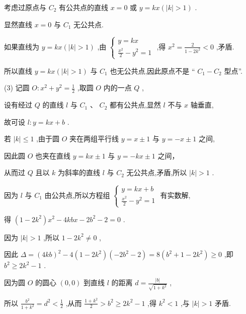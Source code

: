 \documentclass[10pt]{article}
\begin{document}
考虑过原点与 \({C}_{2}\) 有公共点的直线 \(x = 0\) 或 \(y = {kx}\left( {\left| k\right|  > 1}\right)\) .

显然直线 \(x = 0\) 与 \({C}_{1}\) 无公共点.

如果直线为 \(y = {kx}\left( {\left| k\right|  > 1}\right)\) ,由 \(\left\{  \begin{array}{l} y = {kx} \\  \frac{{x}^{2}}{2} - {y}^{2} = 1 \end{array}\right.\) ,得 \({x}^{2} = \frac{2}{1 - 2{k}^{2}} < 0\) ,矛盾.

所以直线 \(y = {kx}\left( {\left| k\right|  > 1}\right)\) 与 \({C}_{1}\) 也无公共点,因此原点不是 “ \({C}_{1} - {C}_{2}\) 型点”.

(3) 记圆 \(O : {x}^{2} + {y}^{2} = \frac{1}{2}\) ,取圆 \(O\) 内的一点 \(Q\) ,

设有经过 \(Q\) 的直线 \(l\) 与 \({C}_{1}\text{ 、 }{C}_{2}\) 都有公共点,显然 \(l\) 不与 \(x\) 轴垂直,

故可设 \(l : y = {kx} + b\) .

若 \(\left| k\right|  \leq  1\) ,由于圆 \(O\) 夹在两组平行线 \(y = x \pm  1\) 与 \(y =  - x \pm  1\) 之间,

因此圆 \(O\) 也夹在直线 \(y = {kx} \pm  1\) 与 \(y =  - {kx} \pm  1\) 之间，

从而过 \(Q\) 且以 \(k\) 为斜率的直线 \(l\) 与 \({C}_{2}\) 无公共点,矛盾,所以 \(\left| k\right|  > 1\) .

因为 \(l\) 与 \({C}_{1}\) 由公共点,所以方程组 \(\left\{  \begin{array}{l} y = {kx} + b \\  \frac{{x}^{2}}{2} - {y}^{2} = 1 \end{array}\right.\) 有实数解,

得 \(\left( {1 - 2{k}^{2}}\right) {x}^{2} - {4kbx} - 2{b}^{2} - 2 = 0\) .

因为 \(\left| k\right|  > 1\) ,所以 \(1 - 2{k}^{2} \neq  0\) ,

因此 \(\Delta  = {\left( 4kb\right) }^{2} - 4\left( {1 - 2{k}^{2}}\right) \left( {-2{b}^{2} - 2}\right)  = 8\left( {{b}^{2} + 1 - 2{k}^{2}}\right)  \geq  0\) ,即 \({b}^{2} \geq  2{k}^{2} - 1\) .

因为圆 \(O\) 的圆心 \(\left( {0,0}\right)\) 到直线 \(l\) 的距离 \(d = \frac{\left| b\right| }{\sqrt{1 + {k}^{2}}}\) ,

所以 \(\frac{{b}^{2}}{1 + {k}^{2}} = {d}^{2} < \frac{1}{2}\) ,从而 \(\frac{1 + {k}^{2}}{2} > {b}^{2} \geq  2{k}^{2} - 1\) ,得 \({k}^{2} < 1\) ,与 \(\left| k\right|  > 1\) 矛盾.
\end{document}
